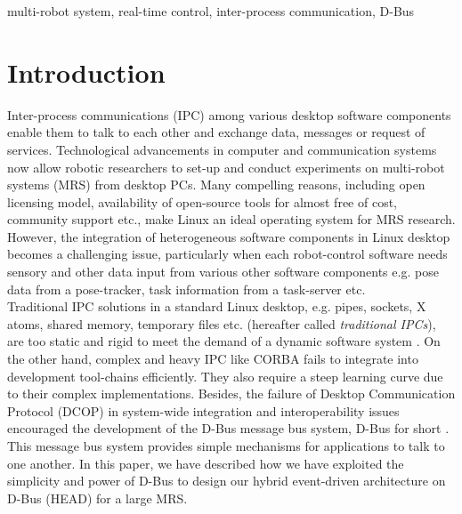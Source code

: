 \documentclass{ifacconf}
\begin{document}
\begin{frontmatter}
\begin{keyword}
multi-robot system, real-time control, inter-process communication, D-Bus
\end{keyword}

\end{frontmatter}
\section{Introduction}
Inter-process communications (IPC) among various desktop software components enable them to talk to each other and exchange data, messages or request of services. Technological advancements in computer and communication systems now allow robotic researchers to set-up and conduct experiments on multi-robot systems (MRS) from desktop PCs. Many compelling reasons, including open licensing model, availability of open-source tools for almost free of cost, community support etc., make Linux an ideal operating system for MRS research. However, the integration of heterogeneous software components in Linux desktop becomes a challenging issue, particularly when each robot-control software needs sensory and other data input from various other software components e.g. pose data from a pose-tracker, task information from a task-server etc.\\ 
Traditional IPC solutions in a standard Linux desktop, e.g. pipes, sockets, X atoms, shared memory, temporary files etc. (hereafter called {\em traditional IPCs}), are too static and rigid to meet the demand of a dynamic software system \citep{wittenburg2005}. On the other hand, complex and heavy IPC like CORBA fails to integrate into  development tool-chains efficiently. They also require a steep learning curve due to their complex implementations. Besides, the failure of Desktop Communication Protocol (DCOP) in system-wide integration and interoperability issues encouraged the development of the D-Bus message bus system, D-Bus for short \citep{Pennington+2010}. This message bus system provides simple mechanisms for applications to talk to one another. In this paper, we have described  how we have exploited the simplicity and power of D-Bus  to design our hybrid event-driven architecture on D-Bus (HEAD) for a large MRS.\\
\end{document}
